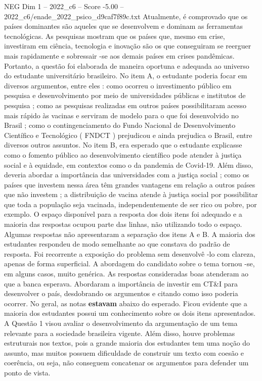 \begin{textsample}{NEG Dim 1 – 2022\_c6 – Score -5.00 – 2022\_c6/enade\_2022\_psico\_d9caf7f89c.txt}
Atualmente, é comprovado que os países dominantes são aqueles que se desenvolvem e dominam as ferramentas tecnológicas.
As pesquisas mostram que os países que, mesmo em crise, investiram em ciência, tecnologia e inovação são os que conseguiram se reerguer mais rapidamente e sobressair -se aos demais países em crises pandêmicas.
Portanto, a questão foi elaborada de maneira oportuna e adequada ao universo do estudante universitário brasileiro.
No item A, o estudante poderia focar em diversos argumentos, entre eles : como ocorreu o investimento público em pesquisa e desenvolvimento por meio de universidades públicas e institutos de pesquisa ; como as pesquisas realizadas em outros países possibilitaram acesso mais rápido às vacinas e serviram de modelo para o que foi desenvolvido no Brasil ; como o contingenciamento do Fundo Nacional de Desenvolvimento Científico e Tecnológico ( FNDCT ) prejudicou e ainda prejudica o Brasil, entre diversos outros assuntos.
No item B, era esperado que o estudante explicasse como o fomento público ao desenvolvimento científico pode atender à justiça social e à equidade, em contextos como o da pandemia de Covid-19.
Além disso, deveria abordar a importância das universidades com a justiça social ; como os países que investem nessa área têm grandes vantagens em relação a outros países que não investem ; a distribuição de vacina atende à justiça social por possibilitar que toda a população seja vacinada, independentemente de ser rico ou pobre, por exemplo.
O espaço disponível para a resposta dos dois itens foi adequado e a maioria das respostas ocupou parte das linhas, não utilizando todo o espaço.
Algumas respostas não apresentaram a separação dos itens A e B.
A maioria dos estudantes respondeu de modo semelhante ao que constava do padrão de resposta.
Foi recorrente a exposição do problema sem desenvolvê -lo com clareza, apenas de forma superficial.
A abordagem do candidato sobre o tema tornou -se, em alguns casos, muito genérica.
As respostas consideradas boas atenderam ao que a banca esperava.
Abordaram a importância de investir em CT\&I para desenvolver o país, desdobrando os argumentos e citando como isso poderia ocorrer.
No geral, as notas \textbf{estavam} abaixo do esperado.
Ficou evidente que a maioria dos estudantes possui um conhecimento sobre os dois itens apresentados.
A Questão 1 visou avaliar o desenvolvimento da argumentação de um tema relevante para a sociedade brasileira vigente.
Além disso, houve problemas estruturais nos textos, pois a grande maioria dos estudantes tem uma noção do assunto, mas muitos possuem dificuldade de construir um texto com coesão e coerência, ou seja, não conseguem concatenar os argumentos para defender um ponto de vista.

\end{textsample}
